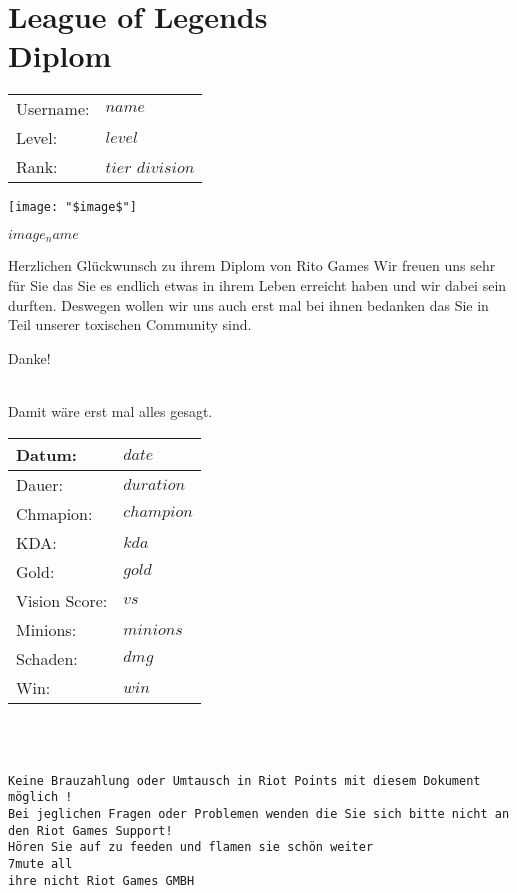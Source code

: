 \documentclass[12pt,a4paper]{article}
\begin{document}
\part*{\center\textbf{League of Legends\\ Diplom}}

\begin{multicols}{2}
\begin{tabular}{ll}
Username: & $name$ \\
Level: & $level$ \\
Rank: & $tier$ $division$ \\
\end{tabular}
\columnbreak

\texttt{[image: "\$image\$"]}

\textbf{$image_name$}\\
\end{multicols}
\bigskip
\begin{center}
Herzlichen Glückwunsch zu ihrem Diplom von Rito Games
Wir freuen uns sehr für Sie das Sie es endlich etwas in ihrem Leben
erreicht haben und wir dabei sein durften.
Deswegen wollen wir uns auch erst mal bei ihnen bedanken das Sie
in Teil unserer toxischen Community sind.
\\
\begin{huge}
Danke!
\end{huge}
\\
Damit wäre erst mal alles gesagt.
\end{center}
\begin{tabular}{|l|l|}
\hline
Datum: & $date$\\
\hline
Dauer: & $duration$ \\
\hline
Chmapion: & $champion$\\
\hline
KDA: & $kda$\\
\hline
Gold: & $gold$ \\
\hline
Vision Score: & $vs$\\
\hline
Minions: & $minions$\\
\hline
Schaden: & $dmg$\\
\hline
Win: & $win$\\
\hline
\end{tabular}\\
\bigskip\\
\begin{center}
\tiny\texttt{Keine Brauzahlung oder Umtausch in Riot Points mit diesem Dokument möglich !\\
Bei jeglichen Fragen oder Problemen wenden die Sie sich bitte nicht an den Riot Games Support!\\
Hören Sie auf zu feeden und flamen sie schön weiter\\7mute all\\ihre nicht Riot Games GMBH}
\end{center}
\end{document}
